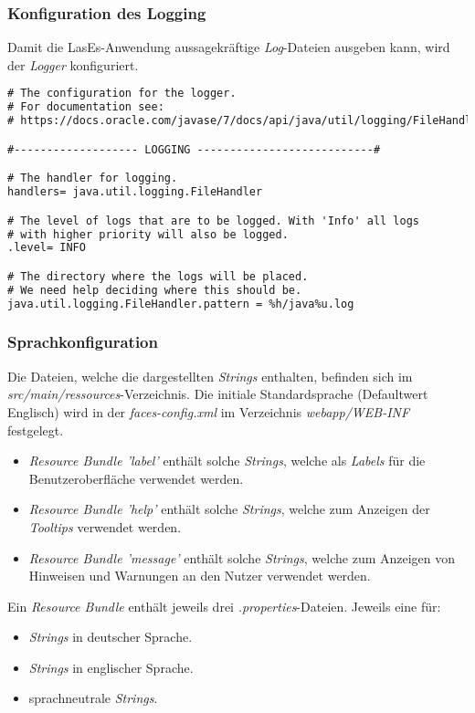 \subsubsection{Konfiguration des Logging}
Damit die LasEs-Anwendung aussagekräftige \emph{Log}-Dateien ausgeben kann,
wird der \emph{Logger} konfiguriert.

\begin{lstlisting}[language=XML, caption = Die Loggingkonfiguration \emph{logger.properties}]
# The configuration for the logger.
# For documentation see:
# https://docs.oracle.com/javase/7/docs/api/java/util/logging/FileHandler.html

#------------------- LOGGING ---------------------------#

# The handler for logging.
handlers= java.util.logging.FileHandler

# The level of logs that are to be logged. With 'Info' all logs
# with higher priority will also be logged.
.level= INFO

# The directory where the logs will be placed.
# We need help deciding where this should be.
java.util.logging.FileHandler.pattern = %h/java%u.log
\end{lstlisting}

\subsubsection{Sprachkonfiguration}
Die Dateien, welche die dargestellten \emph{Strings} enthalten, befinden sich im
\emph{src/main/ressources}-Verzeichnis.
Die initiale Standardsprache (Defaultwert Englisch) wird in der \emph{faces-config.xml} im
Verzeichnis \emph{webapp/WEB-INF} festgelegt.

\begin{itemize}
    \item \emph{Resource Bundle 'label'} enthält solche \emph{Strings}, welche als \emph{Labels} für die Benutzeroberfläche verwendet
    werden.
    \item \emph{Resource Bundle 'help'} enthält solche \emph{Strings}, welche zum Anzeigen der \emph{Tooltips} verwendet
    werden.
    \item \emph{Resource Bundle 'message'} enthält solche \emph{Strings}, welche zum Anzeigen von Hinweisen und Warnungen
    an den Nutzer verwendet werden.
\end{itemize}

Ein \emph{Resource Bundle} enthält jeweils drei \emph{.properties}-Dateien.
Jeweils eine für:
\begin{itemize}
    \item \emph{Strings} in deutscher Sprache.
    \item \emph{Strings} in englischer Sprache.
    \item sprachneutrale \emph{Strings}.
\end{itemize}

